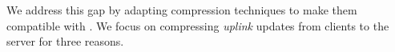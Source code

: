 %
%
%
We address this gap by adapting compression techniques to make them compatible with \SecAgg. We focus on compressing \emph{uplink} updates from clients to the server for three reasons.
